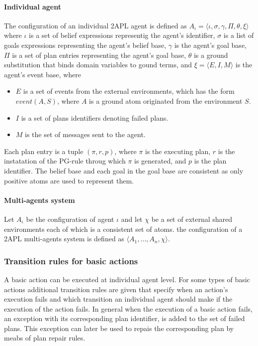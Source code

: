 \documentclass[a4paper]{article}
\begin{document}
\paragraph{Individual agent}

The configuration of an individual 2APL agent is defined as $ A_{\iota} = \langle \iota, \sigma, \gamma, \Pi, \theta, \xi \rangle $ where $\iota$ is a set of belief expressions representig the agent's identifier, $\sigma$ is a list of goals expressions representing the agent's belief base, $\gamma$ is the agent's goal base,  $\Pi$ is a set of plan entries representing the agent's goal base, $\theta$ is a ground substitution that binds domain variables to gound terms, and $\xi = \langle E, I, M \rangle$ is the agent's event base, where

\begin{itemize}
 \item $E$ is a set of events from the external environments, which has the form $event(A,S)$, where $A$ is a ground atom originated from the environment $S$.
 \item $I$ is a set of plans identifiers denoting failed plans.
 \item $M$ is the set of messages sent to the agent.
\end{itemize}

Each plan entry is a tuple $(\pi, r, p)$, where $\pi$ is the executing plan, $r$ is the instatation of the PG-rule throug  which $\pi$ is generated, and $p$ is the plan identifier. The belief base and each goal in the goal base are consistent as only positive atoms are used to represent them.

\paragraph{Multi-agents system}

Let $A_{\iota}$ be the configuration of agent $\iota$ and let $\chi$ be a set of external shared environments each of which is a consistent set of atoms. the configuration of a 2APL multi-agents system is defined as $ \langle A_{1}, \ldots, A_{n}, \chi \rangle $.

\subsubsection{Transition rules for basic actions}

A basic action can be executed at individual agent level. For some types of basic actions additional transition rules are given that specify when an action's execution fails and which transition an individual agent should make if the execution of the action fails. In general when the execution of a basic action fails, an exception with its corresponding plan identifier, is added to the set of failed plans. This exception can later be used to repais the corresponding plan by meabs of plan repair rules.
\end{document}
